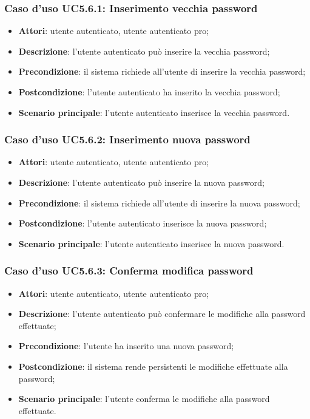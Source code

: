 \subsubsection{Caso d'uso UC5.6.1: Inserimento vecchia password}

\begin{itemize}
	\item \textbf{Attori}: utente autenticato, utente autenticato pro;
	\item \textbf{Descrizione}: l'utente autenticato può inserire la vecchia password;
	\item \textbf{Precondizione}: il sistema richiede all'utente di inserire la vecchia password;
	\item \textbf{Postcondizione}: l'utente autenticato ha inserito la vecchia password;
	\item \textbf{Scenario principale}: l'utente autenticato inserisce la vecchia password.
\end{itemize}

\subsubsection{Caso d'uso UC5.6.2: Inserimento nuova password}

\begin{itemize}
	\item \textbf{Attori}: utente autenticato, utente autenticato pro;
	\item \textbf{Descrizione}: l'utente autenticato può inserire la nuova password;
	\item \textbf{Precondizione}: il sistema richiede all'utente di inserire la nuova password;
	\item \textbf{Postcondizione}: l'utente autenticato inserisce la nuova password;
	\item \textbf{Scenario principale}: l'utente autenticato inserisce la nuova password.
\end{itemize}

\subsubsection{Caso d'uso UC5.6.3: Conferma modifica password}

\begin{itemize}
	\item \textbf{Attori}: utente autenticato, utente autenticato pro;
	\item \textbf{Descrizione}: l'utente autenticato può confermare le modifiche alla password effettuate;
	\item \textbf{Precondizione}: l'utente ha inserito una nuova password;
	\item \textbf{Postcondizione}: il sistema rende persistenti le modifiche effettuate alla password;
	\item \textbf{Scenario principale}: l'utente conferma le modifiche alla password effettuate.
\end{itemize}

